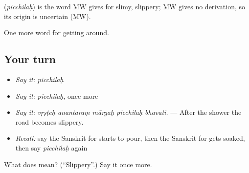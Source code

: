 \begin{cousinweb}
\textbf{} (\emph{picchilaḥ}) is the word MW gives for slimy, slippery; MW gives no derivation, so its origin is uncertain (MW).
\end{cousinweb}

\begin{grammarlens}[title={What you've built}]
One more word for getting around.
\end{grammarlens}

\subsection*{Your turn}
\begin{itemize}
\raggedright
  \item \emph{Say it:} \emph{picchilaḥ}
  \item \emph{Say it:} \emph{picchilaḥ}, once more
  \item \emph{Say it:} \emph{vṛṣṭeḥ anantaraṃ mārgaḥ picchilaḥ bhavati.} — After the shower the road becomes slippery.
  \item \emph{Recall:} say the Sanskrit for starts to pour, then the Sanskrit for gets soaked, then say \emph{picchilaḥ} again
\end{itemize}

\begin{tcolorbox}[breakable,colback=teal!4,colframe=teal!35!black,title={Before you move on}]
What does  mean? (\textquotedblleft{}Slippery\textquotedblright{}.) Say it once more.
\end{tcolorbox}
